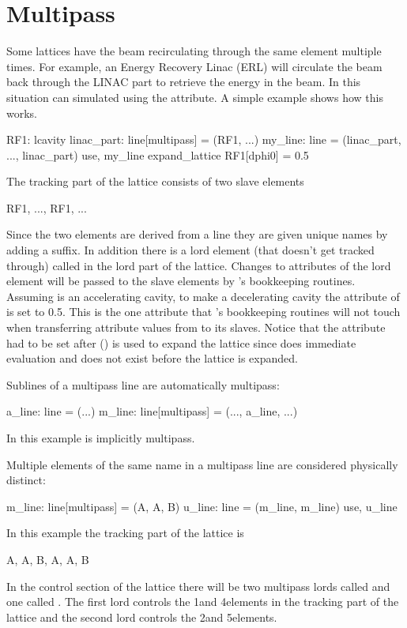 \section{Multipass}
\label{s:multipass}

Some lattices have the beam recirculating through the same element
multiple times. For example, an Energy Recovery Linac (ERL) will
circulate the beam back through the LINAC part to retrieve the energy
in the beam. In \bmad this situation can simulated using the
 attribute. A simple example shows how this works.
\begin{example}
  RF1: lcavity
  linac_part: line[multipass] = (RF1, ...)
  my_line: line = (linac_part, ..., linac_part)
  use, my_line
  expand_lattice
  RF1[dphi0] = 0.5
\end{example}
The tracking part of the lattice consists of two slave elements
\begin{example}
  RF1, ..., RF1, ...
\end{example}
Since the two elements are derived from a  line they are
given unique names by adding a  suffix. In addition there is
a lord element (that doesn't get tracked through) called  in the
lord part of the lattice. Changes to attributes of the lord 
element will be passed to the slave elements by \bmad's bookkeeping
routines. Assuming  is an accelerating cavity, to make
 a decelerating cavity the  attribute of
 is set to 0.5. This is the one attribute that \bmad's
bookkeeping routines will not touch when transferring attribute values
from  to its slaves. Notice that the  attribute had to
be set after  ()
is used to expand the lattice since
\bmad does immediate evaluation and  does not exist before
the lattice is expanded.

Sublines of a multipass line are automatically multipass:
\begin{example}
  a_line: line = (...)
  m_line: line[multipass] = (..., a_line, ...)
\end{example}
In this example  is implicitly multipass.

Multiple elements of the same name in a multipass line are considered 
physically distinct:
\begin{example}
  m_line: line[multipass] = (A, A, B)
  u_line: line = (m_line, m_line)
  use, u_line
\end{example}
In this example the tracking part of the lattice is
\begin{example}
  A, A, B, A, A, B
\end{example}
In the control section of the lattice there will be two multipass
lords called  and one called . The first  lord 
controls the 1\St and 4\Th elements in the tracking part of the lattice 
and the second  lord controls the 2\Nd and 5\Th elements.

